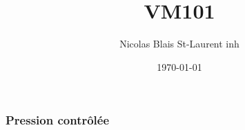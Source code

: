 \documentclass[aspectratio=169]{beamer}
\author{Nicolas Blais St-Laurent \tiny inh}
\title{VM101}
\date{\today}
\begin{document}
\maketitle

\begin{frame}
	\frametitle{Pression contrôlée}
	
\end{frame}
\end{document}
